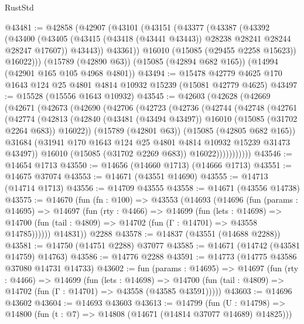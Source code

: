 \begin{lexlean}{RustStd}
\begin{coremodule}
@43481 := @42858
    (@42907
      (@43101
        (@43151
          (@43377
            (@43387
              (@43392
                (@43400
                  (@43405 (@43415 (@43418 (@43441 @43443)) @28238 @28241 @28244 @28247 @17607))
                  @43443))
              @43361))
          @16010
          (@15085 (@29455 @2258 @15623))
          @16022)))
    (@15789 (@42890 @63))
    (@15085 (@42894 @682 @165))
    (@14994 (@42901 @165 @105 @4968 @4801))
@43494 := @15478 @42779 @4625 @170 @1643 @124 @25 @4801 @4814 @10932 @15239 (@15081 @42779 @4625)
@43497 := @15528 (@15556 @1643 @10932)
@43545 := @42603
    (@42628
      (@42669
        (@42671
          (@42673
            (@42690
              (@42706
                (@42723
                  (@42736
                    (@42744
                      (@42748
                        (@42761
                          (@42774
                            (@42813
                              (@42840
                                (@43481 (@43494 @43497))
                                @16010
                                (@15085 (@31702 @2264 @683))
                                @16022))
                            (@15789 (@42801 @63))
                            (@15085 (@42805 @682 @165))
                            @31684
                            (@31941 @170 @1643 @124 @25 @4801 @4814 @10932 @15239 @31473 @43497))
                          @16010
                          (@15085 (@31702 @2269 @683))
                          @16022)))))))))))
@43546 := @14654 @1713
@43550 := @14656 (@14660 @1713) (@14666 @1713)
@43551 := @14675 @37074
@43553 := @14671 (@43551 @14690)
@43555 := @14713 (@14714 @1713)
@43556 := @14709 @43555
@43558 := @14671 (@43556 @14738)
@43575 := @14670
    (fun (fn : @100) =>
    @43553
      (@14693
        (@14696
          (fun (params : @14695) =>
          @14697
            (fun (rty : @4466) =>
            @14699
              (fun (lets : @14698) =>
              @14700 (fun (tail : @4809) => @14702 (fun (Γ : @14701) => @43558 @14785))))))
        @14831))
    @2288
@43578 := @14837 (@43551 (@14688 @2288))
@43581 := @14750 (@14751 @2288) @37077
@43585 := @14671 (@14742 (@43581 @14759) @14763)
@43586 := @14776 @2288
@43591 := @14773 (@14775 @43586 @37080 @14731 @14733)
@43602 := fun (params : @14695) =>
  @14697
    (fun (rty : @4466) =>
    @14699
      (fun (lets : @14698) =>
      @14700 (fun (tail : @4809) => @14702 (fun (Γ : @14701) => @43558 (@43585 @43591)))))
@43603 := @14696 @43602
@43604 := @14693 @43603
@43613 := @14799
    (fun (U : @14798) => @14800 (fun (t : @7) => @14808 (@14671 (@14814 @37077 @14689) @14825)))

\end{coremodule}
\end{lexlean}
